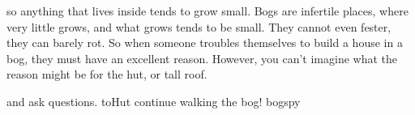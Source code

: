 so anything that lives inside tends to grow small.
Bogs are infertile places, where very little grows, and what grows tends to be small.
They cannot even fester, they can barely rot.
So when someone troubles themselves to build a house in a bog, they must have an excellent reason.
However, you can't imagine what the reason might be for the hut, or tall roof.

\begin{selectPath}
    {and ask questions.}%
    {toHut}
    {continue walking the bog!}%
    {bogspy}
\end{selectPath}

